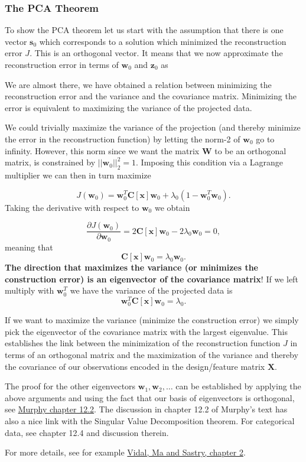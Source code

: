 \documentclass{beamer}
\begin{document}
\begin{frame}
\frametitle{The PCA Theorem}

To show the PCA theorem let us start with the assumption that there is one vector $\bm{s}_0$ which corresponds to a solution which minimized the reconstruction error $J$. This is an orthogonal vector. It means that we now approximate the reconstruction error in terms of $\bm{w}_0$ and $\bm{z}_0$ as

We are almost there, we have obtained a relation between minimizing
the reconstruction error and the variance and the covariance
matrix. Minimizing the error is equivalent to maximizing the variance
of the projected data.

We could trivially maximize the variance of the projection (and
thereby minimize the error in the reconstruction function) by letting
the norm-2 of $\bm{w}_0$ go to infinity. However, this norm since we
want the matrix $\bm{W}$ to be an orthogonal matrix, is constrained by
$\vert\vert \bm{w}_0 \vert\vert_2^2=1$. Imposing this condition via a
Lagrange multiplier we can then in turn maximize

\[
J(\bm{w}_0)= \bm{w}_0^T\bm{C}[\bm{x}]\bm{w}_0+\lambda_0(1-\bm{w}_0^T\bm{w}_0).
\]
Taking the derivative with respect to $\bm{w}_0$ we obtain

\[
\frac{\partial J(\bm{w}_0)}{\partial \bm{w}_0}= 2\bm{C}[\bm{x}]\bm{w}_0-2\lambda_0\bm{w}_0=0,
\]
meaning that
\[
\bm{C}[\bm{x}]\bm{w}_0=\lambda_0\bm{w}_0.
\]
\textbf{The direction that maximizes the variance (or minimizes the construction error) is an eigenvector of the covariance matrix}! If we left multiply with $\bm{w}_0^T$ we have the variance of the projected data is
\[
\bm{w}_0^T\bm{C}[\bm{x}]\bm{w}_0=\lambda_0.
\]

If we want to maximize the variance (minimize the construction error)
we simply pick the eigenvector of the covariance matrix with the
largest eigenvalue. This establishes the link between the minimization
of the reconstruction function $J$ in terms of an orthogonal matrix
and the maximization of the variance and thereby the covariance of our
observations encoded in the design/feature matrix $\bm{X}$.

The proof
for the other eigenvectors $\bm{w}_1,\bm{w}_2,\dots$ can be
established by applying the above arguments and using the fact that
our basis of eigenvectors is orthogonal, see \href{{https://mitpress.mit.edu/books/machine-learning-1}}{Murphy chapter
12.2}.  The
discussion in chapter 12.2 of Murphy's text has also a nice link with
the Singular Value Decomposition theorem. For categorical data, see
chapter 12.4 and discussion therein.

For more details, see for example \href{{https://www.springer.com/gp/book/9780387878102}}{Vidal, Ma and Sastry, chapter 2}.
\end{frame}
\end{document}
